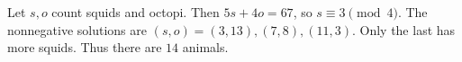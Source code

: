 Let $s,o$ count squids and octopi. Then $5s+4o=67$, so $s\equiv3\pmod4$. The nonnegative solutions are $(s,o)=(3,13),(7,8),(11,3)$. Only the last has more squids. Thus there are $\boxed{14}$ animals.

